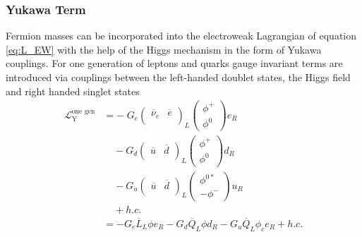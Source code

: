 \subsubsection*{Yukawa Term}\label{sec:yukawa_term}
Fermion masses can be incorporated into the electroweak Lagrangian of equation \ref{eq:L_EW} with the help of the Higgs mechanism in the form of Yukawa couplings. For one generation of leptons and quarks gauge invariant terms are introduced via couplings between the left-handed doublet states, the Higgs field and right handed singlet states
\begin{align}
    \mathcal{L}_\mathrm{Y}^{\text{one gen}} & =
    - \; G_e
    \begin{pmatrix}
        \overline{\nu}_e & \overline{e} \\
    \end{pmatrix}_L
    \begin{pmatrix}
        \phi^+ \\
        \phi^0
    \end{pmatrix}
    e_R                                                                                                                                                                \\
                                            & \phantom{-\;}-G_d
    \begin{pmatrix}
        \overline{u} & \overline{d} \\
    \end{pmatrix}_L
    \begin{pmatrix}
        \phi^+ \\
        \phi^0
    \end{pmatrix}
    d_R                                                                                                                                                                \\
                                            & \phantom{-\;}-G_u
    \begin{pmatrix}
        \overline{u} & \overline{d} \\
    \end{pmatrix}_L
    \begin{pmatrix}
        \phi^{0*} \\
        -\phi^-
    \end{pmatrix}
    u_R                                                                                                                                                                \\
                                            & \phantom{-\;} +h.c.                                                                                                      \\
                                            & = -G_e \overline{L}_L \phi e_R -G_d \overline{Q}_L \phi d_R -G_u \overline{Q}_L \phi_c e_R + h.c. \label{eq:L_Y_one_gen}
\end{align}
